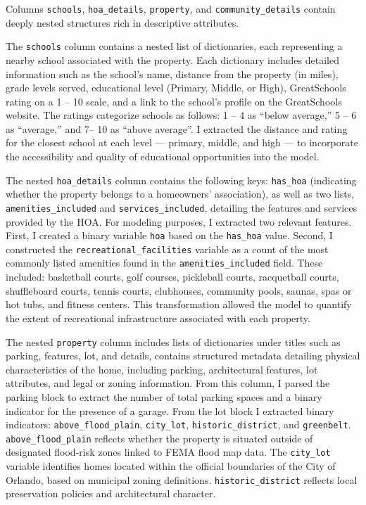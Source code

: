 Columns \texttt{schools}, \texttt{hoa\_details}, \texttt{property}, and \texttt{community\_details} contain deeply nested structures rich in descriptive attributes. 

The \texttt{schools} column contains a nested list of dictionaries, each representing a nearby school associated with the property. Each dictionary includes detailed information such as the school's name, distance from the property (in miles), grade levels served, educational level (Primary, Middle, or High), GreatSchools rating on a 1 -- 10 scale, and a link to the school’s profile on the GreatSchools website. The ratings categorize schools as follows: 1 -- 4 as “below average,” 5 -- 6 as “average,” and 7-- 10 as “above average”.  I extracted the distance and rating for the closest school at each level --- primary, middle, and high --- to incorporate the accessibility and quality of educational opportunities into the model.

The nested \texttt{hoa\_details} column contains the following keys: \texttt{has\_hoa} (indicating whether the property belongs to a homeowners' association), as well as two lists, \texttt{amenities\_included} and \texttt{services\_included}, detailing the features and services provided by the HOA. For modeling purposes, I extracted two relevant features. First, I created a binary variable \texttt{hoa} based on the \texttt{has\_hoa} value. Second, I constructed the \texttt{recreational\_facilities} variable as a count of the most commonly listed amenities found in the \texttt{amenities\_included} field. These included: basketball courts, golf courses, pickleball courts, racquetball courts, shuffleboard courts, tennis courts, clubhouses, community pools, saunas, spas or hot tubs, and fitness centers. This transformation allowed the model to quantify the extent of recreational infrastructure associated with each property. 

The nested \texttt{property} column includes lists of dictionaries under titles such as parking, features, lot, and details, contains structured metadata detailing physical characteristics of the home, including parking, architectural features, lot attributes, and legal or zoning information. From this column, I parsed the parking block to extract the number of total parking spaces and a binary indicator for the presence of a garage. From the lot block I extracted binary indicators: \texttt{above\_flood\_plain},  \texttt{city\_lot}, \texttt{historic\_district},  and \texttt{greenbelt}. \texttt{above\_flood\_plain} reflects whether the property is situated outside of designated flood-risk zones linked to FEMA flood map data. The \texttt{city\_lot} variable identifies homes located within the official boundaries of the City of Orlando, based on municipal zoning definitions. \texttt{historic\_district} reflects local preservation policies and architectural character.

